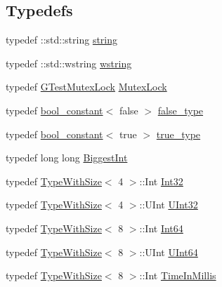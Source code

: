\subsection*{Typedefs}
\begin{DoxyCompactItemize}
\item 
typedef \-::std\-::string \hyperlink{namespacetesting_1_1internal_a5ca8a348395a6145775c1a2334e21889}{string}
\item 
typedef \-::std\-::wstring \hyperlink{namespacetesting_1_1internal_ac7f852174ed7a0a1b1e830b4bbd7c020}{wstring}
\item 
typedef \hyperlink{classtesting_1_1internal_1_1_g_test_mutex_lock}{G\-Test\-Mutex\-Lock} \hyperlink{namespacetesting_1_1internal_a08b187c6cc4e28400aadf9a32fccc8de}{Mutex\-Lock}
\item 
typedef \hyperlink{structtesting_1_1internal_1_1bool__constant}{bool\-\_\-constant}$<$ false $>$ \hyperlink{namespacetesting_1_1internal_a91e570bc966cc243d784dbb550bbbe7d}{false\-\_\-type}
\item 
typedef \hyperlink{structtesting_1_1internal_1_1bool__constant}{bool\-\_\-constant}$<$ true $>$ \hyperlink{namespacetesting_1_1internal_a0189db17b0bd7e74f149d460ea9531a5}{true\-\_\-type}
\item 
typedef long long \hyperlink{namespacetesting_1_1internal_a05c6bd9ede5ccdf25191a590d610dcc6}{Biggest\-Int}
\item 
typedef \hyperlink{classtesting_1_1internal_1_1_type_with_size}{Type\-With\-Size}$<$ 4 $>$\-::Int \hyperlink{namespacetesting_1_1internal_af89e21e4043b5cf0c120af487b24fa06}{Int32}
\item 
typedef \hyperlink{classtesting_1_1internal_1_1_type_with_size}{Type\-With\-Size}$<$ 4 $>$\-::U\-Int \hyperlink{namespacetesting_1_1internal_a436defbb8e92c8e94e33ebcc86f278ba}{U\-Int32}
\item 
typedef \hyperlink{classtesting_1_1internal_1_1_type_with_size}{Type\-With\-Size}$<$ 8 $>$\-::Int \hyperlink{namespacetesting_1_1internal_abd4adb4f2e2d7078a473de91a4089501}{Int64}
\item 
typedef \hyperlink{classtesting_1_1internal_1_1_type_with_size}{Type\-With\-Size}$<$ 8 $>$\-::U\-Int \hyperlink{namespacetesting_1_1internal_ad24ae0a18ae0d3758b9a8333a0b56a4b}{U\-Int64}
\item 
typedef \hyperlink{classtesting_1_1internal_1_1_type_with_size}{Type\-With\-Size}$<$ 8 $>$\-::Int \hyperlink{namespacetesting_1_1internal_a5eed833eddf9ea8ca45546c125f4ef0c}{Time\-In\-Millis}
\item 

\end{DoxyCompactItemize}
